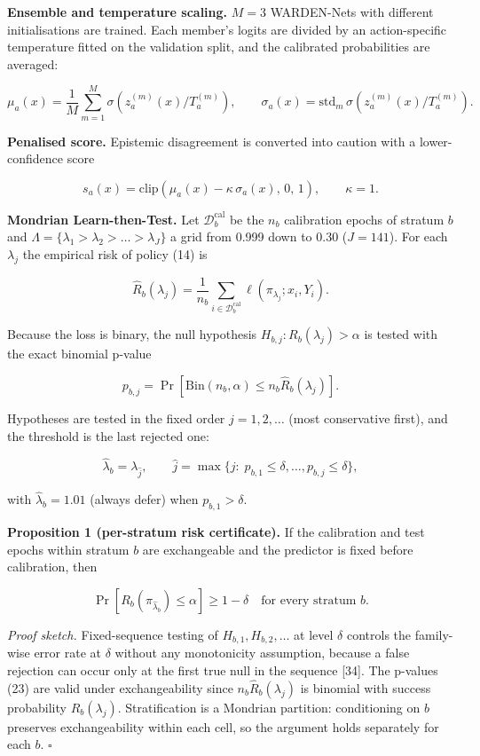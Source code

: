 \documentclass[
  11pt,
]{article}
\begin{document}
\textbf{Ensemble and temperature scaling.} \(M=3\) WARDEN-Nets with
different initialisations are trained. Each member's logits are divided
by an action-specific temperature fitted on the validation split, and
the calibrated probabilities are averaged:

\[\mu_a(x)=\frac{1}{M}\sum_{m=1}^{M}\sigma\!\left(z^{(m)}_a(x)/T^{(m)}_a\right),\qquad \sigma_a(x)=\mathrm{std}_m\,\sigma\!\left(z^{(m)}_a(x)/T^{(m)}_a\right). \tag{20}\]

\textbf{Penalised score.} Epistemic disagreement is converted into
caution with a lower-confidence score

\[s_a(x)=\mathrm{clip}\left(\mu_a(x)-\kappa\,\sigma_a(x),\,0,\,1\right),\qquad \kappa=1. \tag{21}\]

\textbf{Mondrian Learn-then-Test.} Let \(\mathcal{D}^{\mathrm{cal}}_b\)
be the \(n_b\) calibration epochs of stratum \(b\) and
\(\Lambda=\{\lambda_1>\lambda_2>\dots>\lambda_J\}\) a grid from 0.999
down to 0.30 (\(J=141\)). For each \(\lambda_j\) the empirical risk of
policy (14) is

\[\hat R_b(\lambda_j)=\frac{1}{n_b}\sum_{i\in\mathcal{D}^{\mathrm{cal}}_b}\ell(\pi_{\lambda_j};x_i,Y_i). \tag{22}\]

Because the loss is binary, the null hypothesis
\(H_{b,j}:R_b(\lambda_j)>\alpha\) is tested with the exact binomial
p-value

\[p_{b,j}=\Pr\left[\mathrm{Bin}(n_b,\alpha)\le n_b\hat R_b(\lambda_j)\right]. \tag{23}\]

Hypotheses are tested in the fixed order \(j=1,2,\dots\) (most
conservative first), and the threshold is the last rejected one:

\[\hat\lambda_b=\lambda_{\hat j},\qquad \hat j=\max\{j:\;p_{b,1}\le\delta,\dots,p_{b,j}\le\delta\}, \tag{24}\]

with \(\hat\lambda_b=1.01\) (always defer) when \(p_{b,1}>\delta\).

\textbf{Proposition 1 (per-stratum risk certificate).} If the
calibration and test epochs within stratum \(b\) are exchangeable and
the predictor is fixed before calibration, then

\[\Pr\left[R_b(\pi_{\hat\lambda_b})\le\alpha\right]\ge 1-\delta\quad\text{for every stratum } b. \tag{25}\]

\emph{Proof sketch.} Fixed-sequence testing of \(H_{b,1},H_{b,2},\dots\)
at level \(\delta\) controls the family-wise error rate at \(\delta\)
without any monotonicity assumption, because a false rejection can occur
only at the first true null in the sequence {[}34{]}. The p-values (23)
are valid under exchangeability since \(n_b\hat R_b(\lambda_j)\) is
binomial with success probability \(R_b(\lambda_j)\). Stratification is
a Mondrian partition: conditioning on \(b\) preserves exchangeability
within each cell, so the argument holds separately for each \(b\).
\(\square\)
\end{document}
